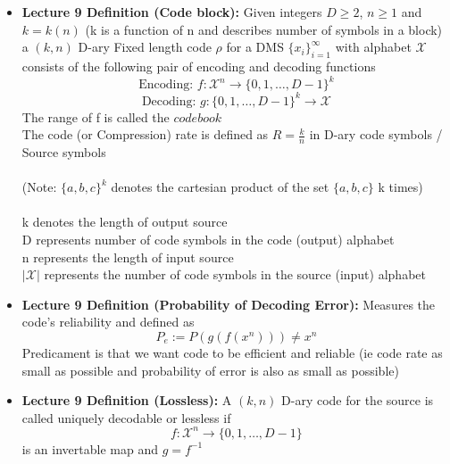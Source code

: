 \documentclass{article}
\begin{document}
\begin{itemize}
    \item \textbf{Lecture 9 Definition (Code block):} Given integers \(D \geq 2\), \(n \geq 1\) and \(k = k(n)\) (k is a function of n and describes number of symbols in a block)  a \((k,n)\) D-ary Fixed length code \(\rho\) for a DMS \(\{x_{i}\}^\infty_{i=1}\) with alphabet \(\mathcal{X}\) consists of the following pair of encoding and decoding functions
    \[\text{Encoding: } f: \mathcal{X}^n \to \{0, 1, \ldots, D-1\}^k\] 
    \[\text{Decoding: } g: \{0, 1, \ldots, D-1\}^k \to \mathcal{X}\]
    The range of f is called the \(\mathit{codebook}\)
    \\ The code (or Compression) rate is defined as \(R = \frac{k}{n}\) in D-ary code symbols / Source symbols 
   \\
    \\(Note: \(\{a,b,c\}^k\) denotes the cartesian product of the set \(\{a,b,c\}\) k times)
    \\
   \\ k denotes the length of output source
   \\ D represents number of code symbols in the code (output) alphabet
   \\ n represents the length of input source
   \\ \(|\mathcal{X}|\) represents the number of code symbols in the source (input) alphabet
   
    \item \textbf{Lecture 9 Definition (Probability of Decoding Error): } Measures the code's reliability and defined as
   \[P_e := P(g(f(x^n))) \neq x^n\]
   Predicament is that we want code to be efficient and reliable (ie code rate as small as possible and probability of error is also as small as possible)
   
   \item \textbf{Lecture 9 Definition (Lossless):} A \((k,n)\) D-ary code for the source is called uniquely decodable or lessless if
    \[f: \mathcal{X}^n \to \{0,1,\ldots, D-1\}\]
    is an invertable map and \(g = f^{-1}\)
\end{itemize}
\end{document}
